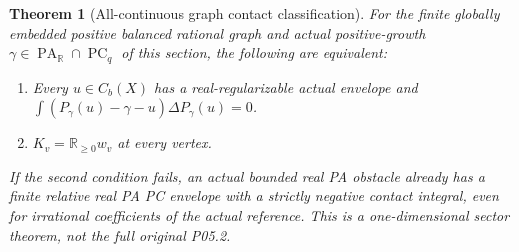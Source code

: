 \documentclass[11pt]{article}
\newtheorem{theorem}{Theorem}
\newcommand{\R}{\mathbb R}
\newcommand{\PC}{\operatorname{PC}}
\newcommand{\PA}{\operatorname{PA}}
\begin{document}
\begin{theorem}[All-continuous graph contact classification]\label{graph-contact}
For the finite globally embedded positive balanced rational graph and
actual positive-growth $\gamma\in\PA_\R\cap\PC_q$ of this section,
the following are equivalent:
\begin{enumerate}
\item Every $u\in C_b(X)$ has a real-regularizable actual envelope and
$\int(P_\gamma(u)-\gamma-u)\Delta P_\gamma(u)=0$.
\item $K_v=\R_{\geq0}w_v$ at every vertex.
\end{enumerate}
If the second condition fails, an actual bounded real PA obstacle already
has a finite relative real PA PC envelope with a strictly negative
contact integral, even for irrational coefficients of the actual reference.
This is a one-dimensional sector theorem, not the full original P05.2.
\end{theorem}
\end{document}
